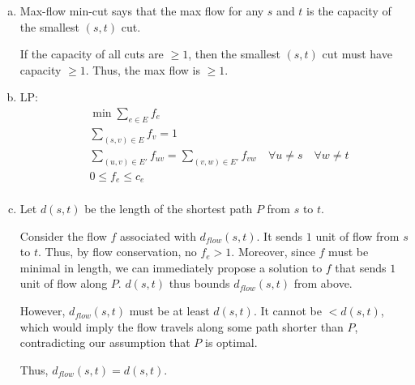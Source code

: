 \documentclass[10pt]{article}
\begin{document}
\begin{solution}

\begin{enumerate}[(a)]
    \item {
        Max-flow min-cut says that the max flow for any $s$ and $t$ is the 
        capacity of the smallest $(s, t)$ cut. 

        If the capacity of all cuts are $\geq 1$, then the smallest $(s, t)$ cut 
        must have capacity $\geq 1$. 
        Thus, the max flow is $\geq 1$. 
    }
    \item {
        LP:
        \begin{align*}
            & \min \sum_{e \in E} f_e \\
            & \sum_{(s, v) \in E} f_v = 1 \\
            & \sum_{(u, v) \in E'}f_{uv} = \sum_{(v, w) \in E'}f_{vw} 
            \quad \forall u \neq s \quad \forall w \neq t \\
            & 0 \leq f_e \leq c_e \\
        \end{align*}
    }
    \item {
        Let $d(s, t)$ be the length of the shortest path $P$ from $s$ to $t$. 

        Consider the flow $f$ associated with $d_{flow}(s, t)$. 
        It sends $1$ unit of flow from $s$ to $t$. 
        Thus, by flow conservation, no $f_e > 1$. 
        Moreover, since $f$ must be minimal in length, we can immediately 
        propose a solution to $f$ that sends $1$ unit of flow along $P$. 
        $d(s, t)$ thus bounds $d_{flow}(s, t)$ from above. 

        However, $d_{flow}(s, t)$ must be at least $d(s, t)$. 
        It cannot be $< d(s, t)$, which would imply the flow travels along some 
        path shorter than $P$, contradicting our assumption that $P$ is optimal. 

        Thus, $d_{flow}(s, t) = d(s, t)$. 
    }
\end{enumerate}

\end{solution}


\newpage

\end{document}
